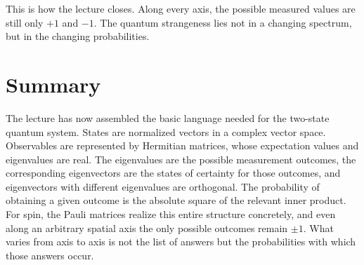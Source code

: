 This is how the lecture closes. Along every axis, the possible measured values are still only \(+1\) and \(-1\). The quantum strangeness lies not in a changing spectrum, but in the changing probabilities.

\section{Summary}

The lecture has now assembled the basic language needed for the two-state quantum system. States are normalized vectors in a complex vector space. Observables are represented by Hermitian matrices, whose expectation values and eigenvalues are real. The eigenvalues are the possible measurement outcomes, the corresponding eigenvectors are the states of certainty for those outcomes, and eigenvectors with different eigenvalues are orthogonal. The probability of obtaining a given outcome is the absolute square of the relevant inner product. For spin, the Pauli matrices realize this entire structure concretely, and even along an arbitrary spatial axis the only possible outcomes remain \(\pm1\). What varies from axis to axis is not the list of answers but the probabilities with which those answers occur.